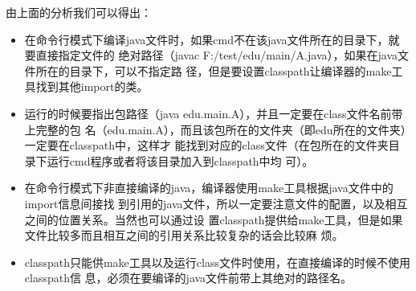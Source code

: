由上面的分析我们可以得出：
\begin{itemize}
\item 在命令行模式下编译java文件时，如果cmd不在该java文件所在的目录下，就要直接指定文件的
  绝对路径（javac F:/test/edu/main/A.java），如果在java文件所在的目录下，可以不指定路
  径，但是要设置classpath让编译器的make工具找到其他import的类。
\item 运行的时候要指出包路径（java edu.main.A），并且一定要在class文件名前带上完整的包
  名（edu.main.A），而且该包所在的文件夹（即edu所在的文件夹）一定要在classpath中，这样才
  能找到对应的class文件（在包所在的文件夹目录下运行cmd程序或者将该目录加入到classpath中均
  可）。
\item 在命令行模式下非直接编译的java，编译器使用make工具根据java文件中的import信息间接找
  到引用的java文件，所以一定要注意文件的配置，以及相互之间的位置关系。当然也可以通过设
  置classpath提供给make工具，但是如果文件比较多而且相互之间的引用关系比较复杂的话会比较麻
  烦。
\item classpath只能供make工具以及运行class文件时使用，在直接编译的时候不使用classpath信
  息，必须在要编译的java文件前带上其绝对的路径名。
\end{itemize}